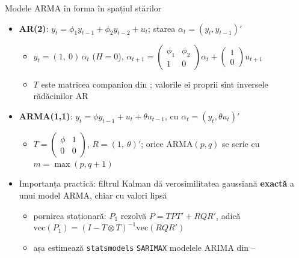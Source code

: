 \begin{frame}{Modele ARMA în forma în spațiul stărilor}
\itemsize{\small}
\begin{itemize}
    \item \textbf{AR(2)}: $y_t = \phi_1y_{t-1} + \phi_2y_{t-2} + u_t$; starea $\alpha_t = (y_t, y_{t-1})'$
    \begin{itemize}
        \item $y_t = (1,\ 0)\,\alpha_t$ ($H = 0$), \quad $\alpha_{t+1} = \begin{pmatrix}\phi_1 & \phi_2\\ 1 & 0\end{pmatrix}\alpha_t + \begin{pmatrix}1\\ 0\end{pmatrix}u_{t+1}$
        \item $T$ este matricea companion din ; valorile ei proprii sînt inversele rădăcinilor AR
    \end{itemize}
    \item \textbf{ARMA(1,1)}: $y_t = \phi y_{t-1} + u_t + \theta u_{t-1}$, cu $\alpha_t = (y_t, \theta u_t)'$
    \begin{itemize}
        \item $T = \begin{pmatrix}\phi & 1\\ 0 & 0\end{pmatrix}$, $R = (1,\ \theta)'$; orice ARMA$(p,q)$ se scrie cu $m = \max(p, q+1)$
    \end{itemize}
    \item Importanța practică: filtrul Kalman dă verosimilitatea gaussiană \textbf{exactă} a unui model ARMA, chiar cu valori lipsă
    \begin{itemize}
        \item pornirea staționară: $P_1$ rezolvă $P = TPT' + RQR'$, adică $\mathrm{vec}(P_1) = (I - T \otimes T)^{-1}\mathrm{vec}(RQR')$
        \item așa estimează \texttt{statsmodels} \texttt{SARIMAX} modelele ARIMA din --
    \end{itemize}
\end{itemize}
\end{frame}

